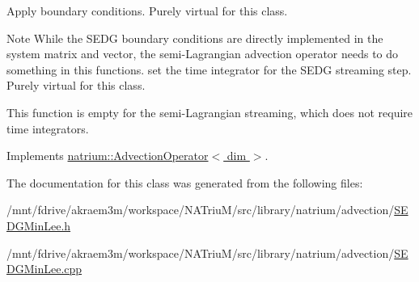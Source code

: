 Apply boundary conditions. Purely virtual for this class. \begin{DoxyNote}{Note}
While the SEDG boundary conditions are directly implemented in the system matrix and vector, the semi-\/Lagrangian advection operator needs to do something in this functions. set the time integrator for the SEDG streaming step. Purely virtual for this class. 

This function is empty for the semi-\/Lagrangian streaming, which does not require time integrators. 
\end{DoxyNote}


Implements \hyperlink{classnatrium_1_1AdvectionOperator_aa93f60c7e7270a35df21387a962d7a38}{natrium::AdvectionOperator$<$ dim $>$}.

The documentation for this class was generated from the following files:\begin{DoxyCompactItemize}
\item 
/mnt/fdrive/akraem3m/workspace/NATriuM/src/library/natrium/advection/\hyperlink{SEDGMinLee_8h}{SEDGMinLee.h}\item 
/mnt/fdrive/akraem3m/workspace/NATriuM/src/library/natrium/advection/\hyperlink{SEDGMinLee_8cpp}{SEDGMinLee.cpp}\end{DoxyCompactItemize}
